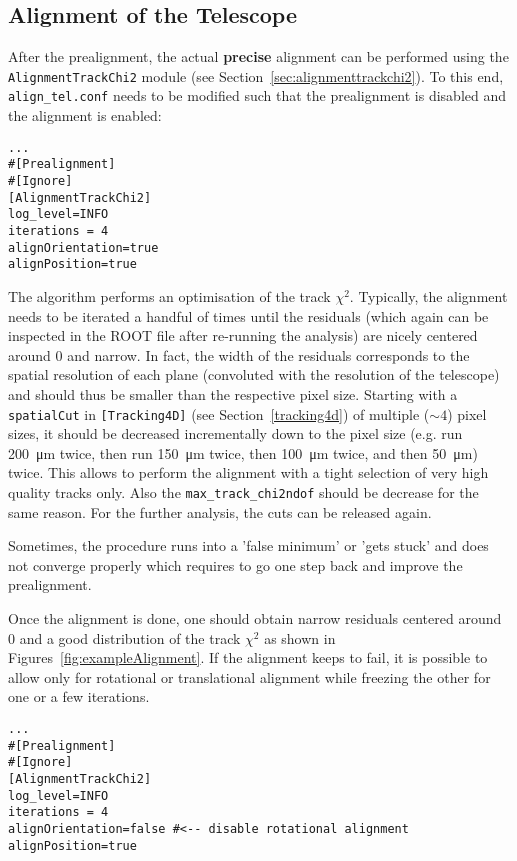 \subsection*{Alignment of the Telescope}
After the prealignment, the actual \textbf{precise} alignment can be performed using the \texttt{AlignmentTrackChi2} module (see Section~\ref{sec:alignmenttrackchi2}).
To this end, \texttt{align\_tel.conf} needs to be modified such that the prealignment is disabled and the alignment is enabled:
\begin{verbatim}
...
#[Prealignment]
#[Ignore]
[AlignmentTrackChi2]
log_level=INFO
iterations = 4
alignOrientation=true
alignPosition=true
\end{verbatim}

The algorithm performs an optimisation of the track $\chi^2$.
Typically, the alignment needs to be iterated a handful of times until the residuals (which again can be inspected in the ROOT file after re-running the analysis) are nicely centered around 0 and narrow.
In fact, the width of the residuals corresponds to the spatial resolution of each plane (convoluted with the resolution of the telescope) and should thus be smaller than the respective pixel size.
Starting with a \texttt{spatialCut} in \texttt{[Tracking4D]} (see Section~\ref{tracking4d}) of multiple ($\sim4$) pixel sizes, it should be decreased incrementally down to the pixel size (e.g. run \SI{200}{\micro\m} twice, then run \SI{150}{\micro\m} twice, then \SI{100}{\micro\m} twice, and then \SI{50}{\micro\m}) twice.
This allows to perform the alignment with a tight selection of very high quality tracks only.
Also the \texttt{max\_track\_chi2ndof} should be decrease for the same reason.
For the further analysis, the cuts can be released again.

Sometimes, the procedure runs into a 'false minimum' or 'gets stuck' and does not converge properly which requires to go one step back and improve the prealignment.

Once the alignment is done, one should obtain narrow residuals centered around 0 and a good distribution of the track $\chi^2$ as shown in Figures~\ref{fig:exampleAlignment}.
If the alignment keeps to fail, it is possible to allow only for rotational or translational alignment while freezing the other for one or a few iterations.

\begin{verbatim}
...
#[Prealignment]
#[Ignore]
[AlignmentTrackChi2]
log_level=INFO
iterations = 4
alignOrientation=false #<-- disable rotational alignment
alignPosition=true
\end{verbatim}

